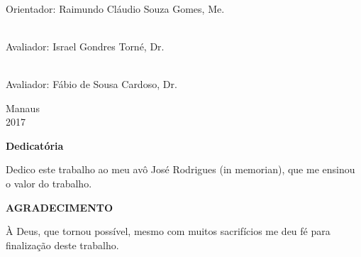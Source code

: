\documentclass[12pt, a4paper]{article}
\begin{document}
\begin{minipage}[l]{14cm}
\begin{center}
\hspace{1cm}\uline{\hspace{10.5cm}} \\
\hspace{1cm}Orientador: Raimundo Cláudio Souza Gomes, Me.

\hspace{1cm}\uline{\hspace{10.5cm}} \\
\hspace{1cm}Avaliador: Israel Gondres Torné, Dr.

\hspace{1cm}\uline{\hspace{10.5cm}} \\
\hspace{1cm}Avaliador: Fábio de Sousa Cardoso, Dr.

\end{center}
\end{minipage}

\hspace*{8cm}

\vspace*{\fill}
\begin{center}
Manaus\\2017
\end{center}



\newpage
\thispagestyle{empty}
\begin{flushright}
\begin{minipage}{8cm}
\begin{singlespace}
{\begin{center}\vspace{18cm}\textbf{\normalsize Dedicatória}\vspace{36pt}\end{center}}
Dedico este trabalho ao meu avô José Rodrigues (in memorian), que me ensinou o valor do trabalho.\\[50pt]
\end{singlespace}
\end{minipage}
\end{flushright}
\newpage
\thispagestyle{empty}
\vspace*{4.5cm}
{\begin{center}\textbf{\normalsize AGRADECIMENTO}\vspace{36pt}\end{center}}
\hspace*{0.8cm}À Deus, que tornou possível, mesmo com muitos sacrifícios me deu fé para finalização deste trabalho.
\end{document}
